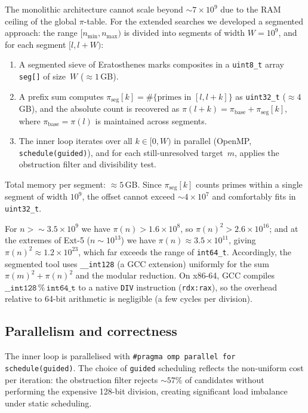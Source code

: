 \documentclass{amsart}
\theoremstyle{definition}
\theoremstyle{remark}
\numberwithin{equation}{section}
\begin{document}
The monolithic architecture cannot scale beyond
$\sim 7 \times 10^9$ due to the RAM ceiling of the global
$\pi$-table.
For the extended searches we developed a segmented approach:
the range $[n_{\min}, n_{\max})$ is divided into segments of width
$W = 10^9$, and for each segment $[l, l+W)$:

\begin{enumerate}
\item A segmented sieve of Eratosthenes marks composites in
  a \texttt{uint8\_t} array \texttt{seg[]} of size~$W$
  ($\approx 1$\,GB).
\item A prefix sum computes $\pi_{\mathrm{seg}}[k]
  = \#\{\text{primes in } [l, l+k]\}$ as \texttt{uint32\_t}
  ($\approx 4$\,GB), and the absolute count is recovered as
  $\pi(l+k) = \pi_{\mathrm{base}} + \pi_{\mathrm{seg}}[k]$,
  where $\pi_{\mathrm{base}} = \pi(l)$ is maintained across
  segments.
\item The inner loop iterates over all $k \in [0, W)$ in parallel
  (OpenMP, \texttt{schedule(guided)}), and for each still-unresolved
  target~$m$, applies the obstruction filter and divisibility test.
\end{enumerate}

Total memory per segment: $\approx 5$\,GB.  Since $\pi_{\mathrm{seg}}[k]$
counts primes within a single segment of width $10^9$, the offset
cannot exceed $\sim 4 \times 10^7$ and comfortably fits in
\texttt{uint32\_t}.

For $n > \sim 3.5 \times 10^9$ we have $\pi(n) > 1.6 \times 10^8$,
so $\pi(n)^2 > 2.6 \times 10^{16}$; and at the extremes of Ext-5
($n \sim 10^{13}$) we have $\pi(n) \approx 3.5 \times 10^{11}$, giving
$\pi(n)^2 \approx 1.2 \times 10^{23}$, which far exceeds the range
of \texttt{int64\_t}.  Accordingly, the segmented tool uses
\texttt{\_\_int128} (a GCC extension) uniformly for the sum
$\pi(m)^2 + \pi(n)^2$ and the modular reduction.
On x86-64, GCC compiles $\mathtt{\_\_int128} \mathbin{\%}
\mathtt{int64\_t}$ to a native \texttt{DIV} instruction
(\texttt{rdx:rax}), so the overhead relative to 64-bit arithmetic
is negligible (a few cycles per division).

\subsection{Parallelism and correctness}

The inner loop is parallelised with
\texttt{\#pragma omp parallel for schedule(guided)}.
The choice of \texttt{guided} scheduling reflects the non-uniform
cost per iteration: the obstruction filter rejects $\sim 57\%$ of
candidates without performing the expensive 128-bit division,
creating significant load imbalance under static scheduling.
\end{document}
